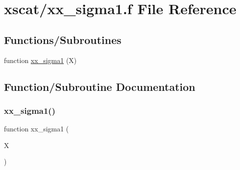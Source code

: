 \hypertarget{xx__sigma1_8f}{}\section{xscat/xx\+\_\+sigma1.f File Reference}
\label{xx__sigma1_8f}
\subsection*{Functions/\+Subroutines}
\begin{DoxyCompactItemize}
\item 
function \hyperlink{xx__sigma1_8f_a93212cb4398166bc81033ccd33140adb}{xx\+\_\+sigma1} (X)
\end{DoxyCompactItemize}


\subsection{Function/\+Subroutine Documentation}
\mbox{\label{xx__sigma1_8f_a93212cb4398166bc81033ccd33140adb}} 
\subsubsection{\texorpdfstring{xx\+\_\+sigma1()}{xx\_sigma1()}}
{\footnotesize\ttfamily function xx\+\_\+sigma1 (\begin{DoxyParamCaption}\item[{}]{X }\end{DoxyParamCaption})}

